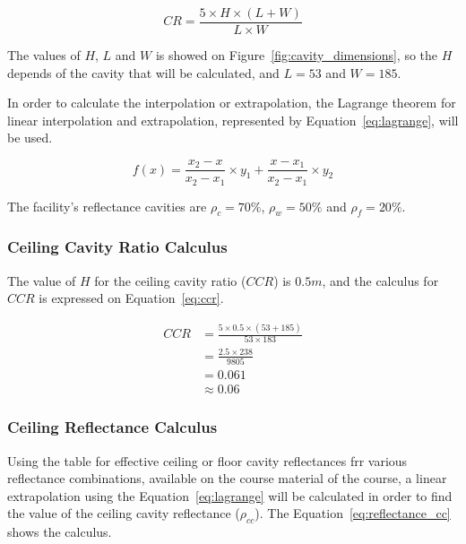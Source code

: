 \begin{equation}
CR = \frac{5 \times H \times (L + W)}{L \times W}
\label{eq:cavity_ratio}
\end{equation}

The values of $H$, $L$ and $W$ is showed on Figure~\ref{fig:cavity_dimensions}, so the $H$ depends of the cavity that will be calculated, and $L = 53$ and $W = 185$.

In order to calculate the interpolation or extrapolation, the Lagrange theorem for linear interpolation and extrapolation, represented by Equation~\ref{eq:lagrange}, will be used.

\begin{equation}
f(x) = \frac{x_2 - x}{x_2 - x_1} \times y_1 +
       \frac{x - x_1}{x_2 - x_1} \times y_2
\label{eq:lagrange}
\end{equation}

The facility's reflectance cavities are $\rho_c=70\%$, $\rho_w=50\%$ and $\rho_f=20\%$.

\subsubsection{Ceiling Cavity Ratio Calculus}
The value of $H$ for the ceiling cavity ratio ($CCR$) is $0.5m$, and the calculus for $CCR$ is expressed on Equation~\ref{eq:ccr}.

\begin{equation}
\begin{split}
CCR & = \frac{5 \times 0.5 \times (53 + 185)}{53 \times 183} \\
 & = \frac{2.5 \times 238}{9805} \\
 & = 0.061 \\
 & \approx 0.06
\end{split}
\label{eq:ccr}
\end{equation}

\subsubsection{Ceiling Reflectance Calculus}
Using the table for effective ceiling or floor cavity reflectances frr various reflectance combinations, available on the course material of the course, a linear extrapolation using the Equation~\ref{eq:lagrange} will be calculated in order to find the value of the ceiling cavity reflectance ($\rho_{cc}$). The Equation~\ref{eq:reflectance_cc} shows the calculus.

